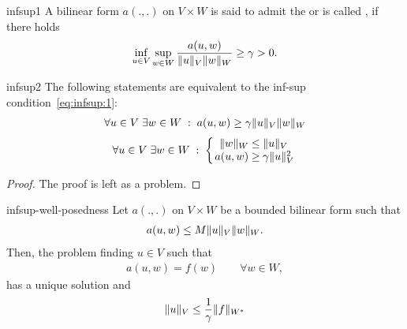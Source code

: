\begin{Definition}{infsup1}
  A bilinear form $a(.,.)$ on $V\times W$ is said to admit the
   or is called , if
  there holds
  \begin{gather}
    \label{eq:infsup:1}
    \inf_{u\in V} \sup_{w\in W} \frac{a(u,w)}{\lVert u\rVert_V\lVert w\rVert_W}
    \ge \gamma > 0.
  \end{gather}
\end{Definition}

\begin{Lemma}{infsup2}
  The following statements are equivalent to the inf-sup
  condition~\eqref{eq:infsup:1}:
  \begin{gather}
    \label{eq:infsup:2}
    \forall u\in V \;\exists w\in W \;:\; a(u,w) \ge \gamma \lVert u\rVert_V\lVert w\rVert_W
  \end{gather}
  \begin{gather}
    \label{eq:infsup:3}
    \forall u\in V
    \;\exists w\in W \;:\;
    \left\{
    \arraycolsep0.3ex
    \begin{array}{rcl}
      \norm{w}_W &\le&\norm{u}_V\\
      a(u,w) &\ge& \gamma \norm{u}_V^2
    \end{array}
    \right.
  \end{gather}
\end{Lemma}

\begin{proof}
  The proof is left as a problem.
\end{proof}

\begin{Theorem}{infsup-well-posedness}
  Let $a(.,.)$ on $V\times W$ be a bounded bilinear form such that
  \begin{gather}
    a(u,w) \le M \lVert u\rVert_V \lVert w\rVert_W.
  \end{gather}
  Then, the problem finding $u\in V$ such that
  \begin{gather}
    a(u,w) = f(w) \qquad\forall w\in W,
  \end{gather}
  has a unique solution and
  \begin{gather}
    \lVert u\rVert_V \le \frac1\gamma \lVert f\rVert_{W^*}
  \end{gather}
\end{Theorem}
